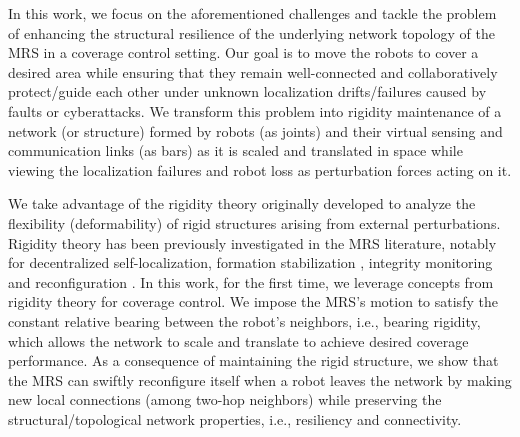 In this work, we focus on the aforementioned challenges and tackle the problem of enhancing the structural resilience of the underlying network topology of the MRS in a coverage control setting. Our goal is to move the robots to cover a desired area while ensuring that they remain well-connected and collaboratively protect/guide each other under unknown localization drifts/failures caused by faults or cyberattacks. We transform this problem into rigidity maintenance of a network (or structure) formed by robots (as joints) and their virtual sensing and communication links (as bars) as it is scaled and translated in space while viewing the localization failures and robot loss as perturbation forces acting on it.

We take advantage of the rigidity theory originally developed to analyze the flexibility (deformability) of rigid structures arising from external perturbations. Rigidity theory has been previously investigated in the MRS literature, notably for decentralized self-localization\cite{zhao2015control}, formation stabilization \cite{zhao2015bearing,schiano2016rigidity}, integrity monitoring \cite{vijay2025range} and reconfiguration \cite{anderson2008rigid}. In this work, for the first time, we leverage concepts from rigidity theory for coverage control. We impose the MRS's motion to satisfy the constant relative bearing between the robot's neighbors, i.e., bearing rigidity, which allows the network to scale and translate to achieve desired coverage performance.
As a consequence of maintaining the rigid structure, we show that the MRS can swiftly reconfigure itself when a robot leaves the network by making new local connections (among two-hop neighbors) while preserving the structural/topological network properties, i.e., resiliency and connectivity.

